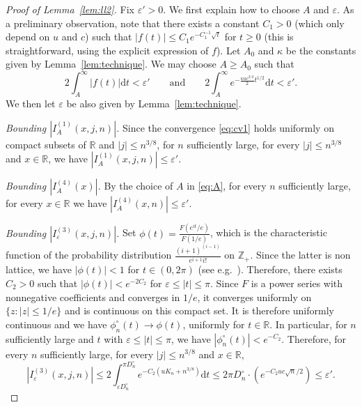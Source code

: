\documentclass[10pt]{amsart}
\theoremstyle{definition}\newtheorem{defi}[theo]{Definition}\newtheorem{rema}[theo]{Remark}\newtheorem{exam}[theo]{Example}\newtheorem{exem}[theo]{Example}\newtheorem{nota}[theo]{Notation}
\newcommand{\Z}{\mathbb{Z}}
\newcommand{\R}{\mathbb{R}}
\def\phicn{\phi^{\circ}_{n}}
\def\Dcn{D^{\circ}_{n}}
\renewcommand{\epsilon}{\varepsilon}
\begin{document}
\begin{proof}[Proof of Lemma~\ref{lem:ll2}]
Fix $\epsilon'>0$. We first explain how to choose $A$ and $\epsilon$.
As a preliminary observation, note that there exists a constant $C_{1}>0$
(which only depend on $u$ and $c$) such that $|f(t)| \leq C_{1} e^{-C_{1}^{-1} \sqrt{t}}$ for $t \geq 0$
(this is straightforward, using the explicit expression of $f$).
Let $A_{0}$ and $\kappa$ be the constants given by Lemma~\ref{lem:technique}.
We may choose $A \geq A_{0}$ such that
\begin{equation}
\label{eq:A}2\int_{A}^{\infty} |f(t)|  \mathrm{d}t <\epsilon' \qquad \textrm{and} \qquad  2 \int_{A}^{\infty} e^{- \frac{\kappa u c^{3/2}}{2} t^{1/2}} \mathrm{d}t < \epsilon'.
\end{equation}
We then let $\epsilon$ be also given by Lemma~\ref{lem:technique}.






\emph{Bounding $|I^{(1)}_{A}(x,j,n)|$.} Since the convergence \eqref{eq:cv1} holds  uniformly on compact subsets of $\R$ and $|j| \leq n^{3/8}$, for   $n$ sufficiently large, for every $|j| \leq n^{3/8}$ and $x \in \R$, we have $|I^{(1)}_{A}(x,j,n)| \leq \epsilon'$.

\emph{Bounding $|I^{(4)}_{A}(x)|$.} By the choice of $A$ in \eqref{eq:A}, for every $n$ sufficiently large, for every $x \in \R$ we have $|I^{(4)}_{A}(x,n)| \leq \epsilon'$.

\emph{Bounding $|I^{(3)}_{\epsilon}(x,j,n)|$.}  Set $\phi(t)=\frac{F(e^{it}/e)}{F(1/e)}$, which is the characteristic function of  the probability distribution $ \frac{(i+1)^{(i-1)}}{e^{i+1} i!}$ on $\Z_{+}$. Since the latter is non lattice, we have $|\phi(t)|<1$ for $t \in (0,2\pi)$ (see e.g.~\cite[Theorem 3.5.1]{Dur10}).
Therefore, there exists $C_2>0$ such that $|\phi(t)|<e^{-2C_2}$ for $ \epsilon \leq |t| \leq \pi$.
Since $F$ is a power series with nonnegative coefficients and converges in $1/e$,
it converges uniformly on $\{z: |z| \le 1/e\}$ and is continuous on this compact set.
It is therefore uniformly continuous and
we have $\phicn(t) \rightarrow \phi(t)$, uniformly for $t \in \R$.
In particular, for $n$ sufficiently large and $t$ with $ \epsilon \leq |t| \leq \pi$,
we have $|\phicn(t)|<e^{-C_2}$.
 Therefore, for every $n$ sufficiently large, for every $|j| \leq n^{3/8}$ and  $x \in \R$,
 \[ \left|I^{(3)}_{\epsilon}(x,j,n) \right|  \leq 2 \int_{\epsilon \Dcn}^{\pi \Dcn} e^{-C_2 (uK_{n}  +n^{3/8})} \mathrm{d}t
 \leq 2 \pi \Dcn \cdot (e^{- C_2 u c \sqrt{n}/2} ) \le \epsilon'.\]


\end{proof}
\end{document}
